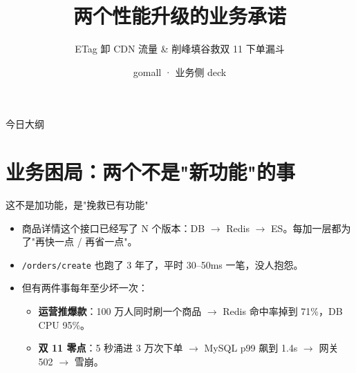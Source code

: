 

\title{两个性能升级的业务承诺}
\subtitle{ETag 卸 CDN 流量 \& 削峰填谷救双 11 下单漏斗}
\author{gomall · 业务侧 deck}
\date{}



\maketitle

\begin{frame}{今日大纲}
\tableofcontents
\end{frame}

\section{业务困局：两个不是"新功能"的事}

\begin{frame}{这不是加功能，是"挽救已有功能"}
\begin{itemize}
  \item 商品详情这个接口已经写了 N 个版本：DB $\to$ Redis $\to$ ES。每加一层都为了"再快一点 / 再省一点"。
  \item \texttt{/orders/create} 也跑了 3 年了，平时 30--50ms 一笔，没人抱怨。
  \item 但有两件事每年至少坏一次：
  \begin{itemize}
    \item \textbf{运营推爆款}：100 万人同时刷一个商品 $\to$ Redis 命中率掉到 71\%，DB CPU 95\%。
    \item \textbf{双 11 零点}：5 秒涌进 3 万次下单 $\to$ MySQL p99 飙到 1.4s $\to$ 网关 502 $\to$ 雪崩。
  \end{itemize}
\end{itemize}
\end{frame}

